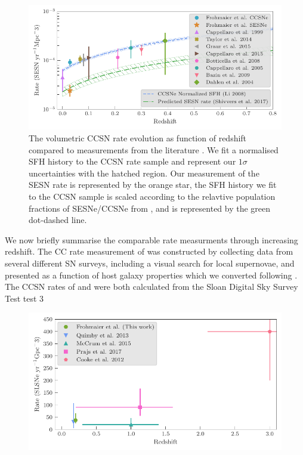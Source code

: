 \documentclass[a4paper,fleqn,usenatbib]{mnras}
\begin{document}
\begin{figure}
	\includegraphics[width=\linewidth]{./allCC_Compare_Literature.pdf}
    \caption{The volumetric CCSN rate evolution as function of redshift compared to measurements from the literature \citep{1999A&A...351..459C,2014ApJ...792..135T,2015MNRAS.450..905G,2015A&A...584A..62C,2008A&A...479...49B,2005A&A...430...83C,2009A&A...499..653B,2004ApJ...613..189D}. We fit a normalised SFH history \citep[blue dashed line;][]{2008MNRAS.388.1487L} to the CCSN rate sample and represent our $1\sigma$ uncertainties with the hatched region. Our measurement of the SESN rate is represented by the orange star, the SFH history we fit to the CCSN sample is scaled according to the relavtive population fractions of SESNe/CCSNe from \citet{2017PASP..129e4201S}, and is represented by the green dot-dashed line.}
    \label{fig:rates_CC_lit}
\end{figure}

We now briefly summarise the comparable rate measurments through increasing redshift. The CC rate measurement of \citet{1999A&A...351..459C} was constructed by collecting data from several different SN surveys, including a visual search for local supernovae, and presented as a function of host galaxy properties which we converted following \citet{2008A&A...479...49B}. The CCSN rates of \citet{2014ApJ...792..135T} and \citet{2015MNRAS.450..905G} were both calculated from the Sloan Digital Sky Survey %
Test test 3

\begin{figure}
	\includegraphics[width=\linewidth]{./SLSN_Compare_Literature.pdf}
    \caption{}
    \label{fig:rates_SLSN_Lit}
\end{figure}
\end{document}
